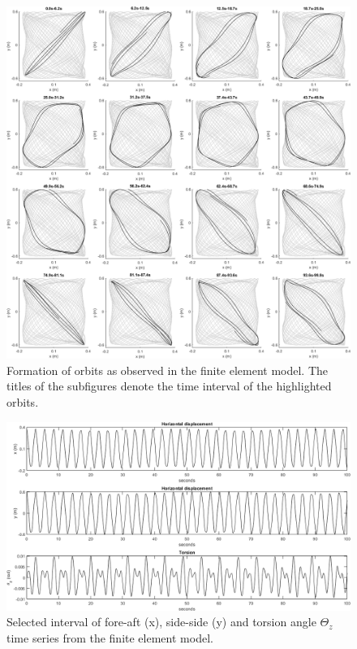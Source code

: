 \documentclass{article}
\begin{document}
\begin{figure}
    \centering
    \includegraphics[width=1\textwidth]{figures/OrbitFormation.png}
    \caption{Formation of orbits as observed in the finite element model. The titles of the subfigures denote the time interval of the highlighted orbits.}
    \label{fig:fea:orbit_formation}
\end{figure}

\begin{figure}
    \centering
    \includegraphics[width=1\textwidth]{figures/OrbitDisplacemen.png}
    \caption{Selected interval of fore-aft (x), side-side (y) and torsion angle $\Theta_z$ time series from the finite element model.}
    \label{fig:fea:simres:timeseries}
\end{figure}
\end{document}

